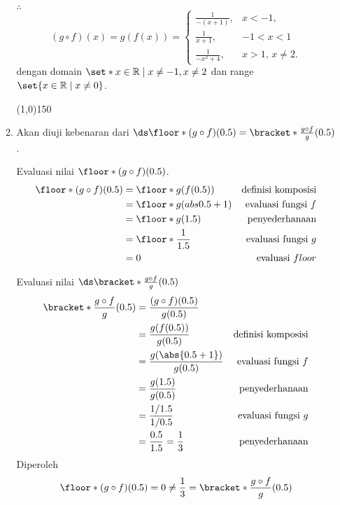 \begin{enumerate}[leftmargin=*, label={\arabic*}.]
\begin{enumerate}[label={\alph*}.]
$\therefore$ 
\[
    (g\circ f)(x) = g(f(x)) = 
    \begin{cases}
        \frac{1}{-(x+1)}, & x < -1,\\
        \frac{1}{x+1}, &-1 < x < 1 \\
        \frac{1}{-x^{2}+4}, &x > 1,\,x \neq 2.
    \end{cases}
\]
dengan domain $\set*{x \in \mathbb{R} \mid x \neq -1, x\neq 2}$ dan range
$\set{x \in \mathbb{R} \mid x \neq 0}$.
\begin{center}
    \line(1,0){150}
\end{center}
\item Akan diuji kebenaran dari 
$\ds \floor*{(g \circ f)(0.5)} = \bracket*{\frac{g \circ f}{g}}(0.5)$.

Evaluasi nilai $\floor*{(g \circ f)(0.5)}$.
\begin{align*}
    \floor*{(g \circ f)(0.5)}
    &= \floor*{g(f(0.5))}
    &\text{definisi komposisi} \\
    &= \floor*{g(abs{0.5+1})} 
    &\text{evaluasi fungsi $f$} \\
    &= \floor*{g(1.5)}
    &\text{penyederhanaan}\\
    &=\floor*{\frac{1}{1.5}}
    &\text{evaluasi fungsi $g$}\\
    &=0 
    &\text{evaluasi $floor$}
\end{align*}

Evaluasi nilai $\ds \bracket*{\frac{g \circ f}{g}}(0.5)$
\begin{align*}
    \bracket*{\frac{g \circ f}{g}}(0.5) &= \frac{(g\circ f)(0.5)}{g(0.5)}\\
    &= \frac{g(f(0.5))}{g(0.5)} 
    &\text{definisi komposisi}\\
    &= \frac{g(\abs{0.5+1})}{g(0.5)}
    &\text{evaluasi fungsi $f$} \\
    &= \frac{g(1.5)}{g(0.5)} 
    &\text{penyederhanaan}\\
    &= \frac{1/1.5}{1/0.5}
    &\text{evaluasi fungsi $g$}\\
    &=\frac{0.5}{1.5} = \frac{1}{3}
    &\text{penyederhanaan}
\end{align*}
Diperoleh 
\[
    \floor*{(g \circ f)(0.5)} = 0 \neq \frac{1}{3} = \bracket*{\frac{g \circ f}{g}}(0.5)
\]


\end{enumerate}
\end{enumerate}
